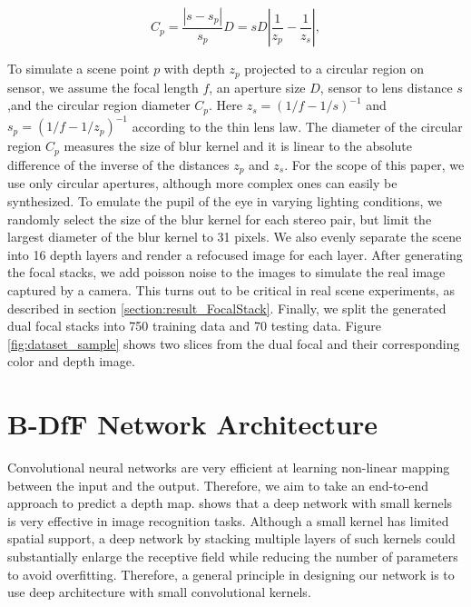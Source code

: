 \documentclass[10pt,twocolumn,letterpaper]{article}
\begin{document}
\begin{equation}
C_p = \frac{|s-s_p|}{s_p}D = sD|\frac{1}{z_p} - \frac{1}{z_s}|,
\end{equation}

To simulate a scene point $p$ with depth $z_p$ projected to a circular region on sensor, we assume the focal length $f$, an aperture size $D$, sensor to lens distance $s$,and the circular region diameter $C_p$. Here $z_s = (1/f - 1/s)^{-1}$ and $s_p = (1/f - 1/z_p)^{-1}$ according to the thin lens law. The diameter of the circular region $C_p$ measures the size of blur kernel and it is linear to the absolute difference of the inverse of the distances $z_p$ and $z_s$. For the scope of this paper, we use only circular apertures, although more complex ones can easily be synthesized. To emulate the pupil of the eye in varying lighting conditions, we randomly select the size of the blur kernel for each stereo pair, but limit the largest diameter of the blur kernel to 31 pixels. We also evenly separate the scene into 16 depth layers and render a refocused image for each layer. After generating the focal stacks, we add poisson noise to the images to simulate the real image captured by a camera. This turns out to be critical in real scene experiments, as described in section \ref{section:result_FocalStack}. Finally, we split the generated dual focal stacks into 750 training data and 70 testing data. Figure \ref{fig:dataset_sample} shows two slices from the dual focal and their corresponding color and depth image.



\section{B-DfF Network Architecture}

\label{section:NetworkArchitectures}

Convolutional neural networks are very efficient at learning non-linear mapping between the input and the output. Therefore, we aim to take an end-to-end approach to predict a depth map. \cite{simonyan14} shows that a deep network with small kernels is very effective in image recognition tasks. Although a small kernel has limited spatial support, a deep network by stacking multiple layers of such kernels could substantially enlarge the receptive field while reducing the number of parameters to avoid overfitting. Therefore, a general principle in designing our network is to use deep architecture with small convolutional kernels.
\end{document}
